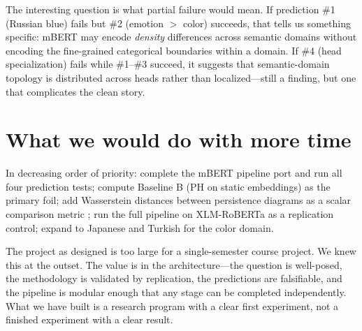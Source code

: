 The interesting question is what partial failure would mean. If prediction \#1 (Russian blue) fails but \#2 (emotion $>$ color) succeeds, that tells us something specific: mBERT may encode \emph{density} differences across semantic domains without encoding the fine-grained categorical boundaries within a domain. If \#4 (head specialization) fails while \#1--\#3 succeed, it suggests that semantic-domain topology is distributed across heads rather than localized---still a finding, but one that complicates the clean story.

\section{What we would do with more time}

In decreasing order of priority: complete the mBERT pipeline port and run all four prediction tests; compute Baseline B (PH on static embeddings) as the primary foil; add Wasserstein distances between persistence diagrams as a scalar comparison metric \parencite{cohensteiner2007}; run the full pipeline on XLM-RoBERTa as a replication control; expand to Japanese and Turkish for the color domain.

The project as designed is too large for a single-semester course project. We knew this at the outset. The value is in the architecture---the question is well-posed, the methodology is validated by replication, the predictions are falsifiable, and the pipeline is modular enough that any stage can be completed independently. What we have built is a research program with a clear first experiment, not a finished experiment with a clear result.
